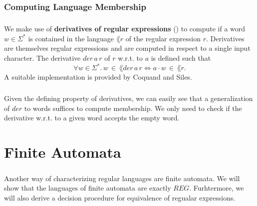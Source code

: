 \documentclass[11pt,a4paper,oneside]{book}
\begin{document}

                \subsection{Computing Language Membership}
                    \paragraph{}
                We make use of \textbf{derivatives of regular expressions} (\cite{DBLP:journals/jacm/Brzozowski64}) to compute if a word $w \in \Sigma^*$ is contained in the language $\lang{r}$ of the regular expression $r$. Derivatives are themselves regular expressions and are computed in respect to a single input character. The derivative $der \,  a \, r$ of $r$ w.r.t. to $a$ is defined such that 
                \[
                    \forall w \in \Sigma^*. \, w \, \in \, \lang{der \, a \, r} \Leftrightarrow a\cdot w \, \in \, \lang{r}.
                \]
                A suitable implementation is provided by Coquand and Siles.


                \paragraph{} 
                    Given the defining property of derivatives, we can easily see that a generalization of $der$ to words suffices to compute membership. We only need to check if the derivative w.r.t. to a given word accepts the empty word.


            

    \chapter{Finite Automata}
        \paragraph{} 
        Another way of characterizing regular languages are finite automata. 
        We will show that the languages of finite automata are exactly $REG$. 
        Furhtermore, we will also derive a decision procedure for equivalence of regualar expressions.
\end{document}
